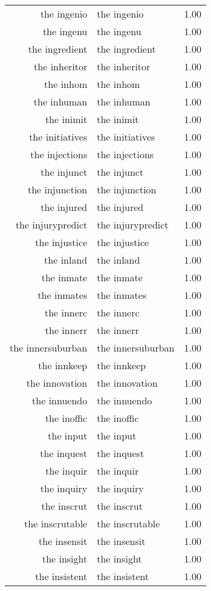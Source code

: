 \begin{table}[ht]
\begin{tabular}{rlr}
  the ingenio & the ingenio & 1.00 \\ 
  the ingenu & the ingenu & 1.00 \\ 
  the ingredient & the ingredient & 1.00 \\ 
  the inheritor & the inheritor & 1.00 \\ 
  the inhom & the inhom & 1.00 \\ 
  the inhuman & the inhuman & 1.00 \\ 
  the inimit & the inimit & 1.00 \\ 
  the initiatives & the initiatives & 1.00 \\ 
  the injections & the injections & 1.00 \\ 
  the injunct & the injunct & 1.00 \\ 
  the injunction & the injunction & 1.00 \\ 
  the injured & the injured & 1.00 \\ 
  the injurypredict & the injurypredict & 1.00 \\ 
  the injustice & the injustice & 1.00 \\ 
  the inland & the inland & 1.00 \\ 
  the inmate & the inmate & 1.00 \\ 
  the inmates & the inmates & 1.00 \\ 
  the innerc & the innerc & 1.00 \\ 
  the innerr & the innerr & 1.00 \\ 
  the innersuburban & the innersuburban & 1.00 \\ 
  the innkeep & the innkeep & 1.00 \\ 
  the innovation & the innovation & 1.00 \\ 
  the innuendo & the innuendo & 1.00 \\ 
  the inoffic & the inoffic & 1.00 \\ 
  the input & the input & 1.00 \\ 
  the inquest & the inquest & 1.00 \\ 
  the inquir & the inquir & 1.00 \\ 
  the inquiry & the inquiry & 1.00 \\ 
  the inscrut & the inscrut & 1.00 \\ 
  the inscrutable & the inscrutable & 1.00 \\ 
  the insensit & the insensit & 1.00 \\ 
  the insight & the insight & 1.00 \\ 
  the insistent & the insistent & 1.00 \\ 

\end{tabular}
\end{table}
